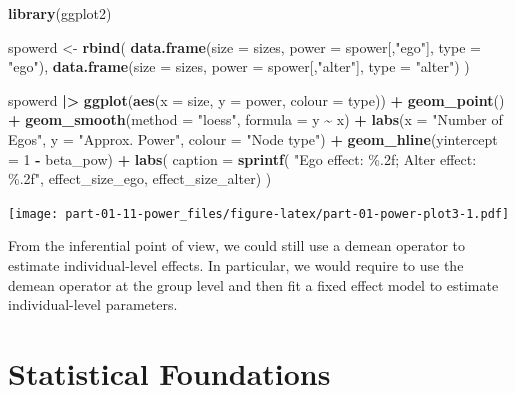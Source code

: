 \documentclass[
]{book}
\newenvironment{Shaded}{\begin{snugshade}}{\end{snugshade}}
\newcommand{\AttributeTok}[1]{\textcolor[rgb]{0.13,0.29,0.53}{#1}}
\newcommand{\DecValTok}[1]{\textcolor[rgb]{0.00,0.00,0.81}{#1}}
\newcommand{\FunctionTok}[1]{\textcolor[rgb]{0.13,0.29,0.53}{\textbf{#1}}}
\newcommand{\NormalTok}[1]{#1}
\newcommand{\OtherTok}[1]{\textcolor[rgb]{0.56,0.35,0.01}{#1}}
\newcommand{\SpecialCharTok}[1]{\textcolor[rgb]{0.81,0.36,0.00}{\textbf{#1}}}
\newcommand{\StringTok}[1]{\textcolor[rgb]{0.31,0.60,0.02}{#1}}
\begin{document}
\begin{Shaded}
\begin{Highlighting}[]
\FunctionTok{library}\NormalTok{(ggplot2)}

\NormalTok{spowerd }\OtherTok{\textless{}{-}} \FunctionTok{rbind}\NormalTok{(}
  \FunctionTok{data.frame}\NormalTok{(}\AttributeTok{size =}\NormalTok{ sizes, }\AttributeTok{power =}\NormalTok{ spower[,}\StringTok{"ego"}\NormalTok{], }\AttributeTok{type =}  \StringTok{"ego"}\NormalTok{),}
  \FunctionTok{data.frame}\NormalTok{(}\AttributeTok{size =}\NormalTok{ sizes, }\AttributeTok{power =}\NormalTok{ spower[,}\StringTok{"alter"}\NormalTok{], }\AttributeTok{type =}  \StringTok{"alter"}\NormalTok{)}
\NormalTok{)}

\NormalTok{spowerd }\SpecialCharTok{|\textgreater{}}
  \FunctionTok{ggplot}\NormalTok{(}\FunctionTok{aes}\NormalTok{(}\AttributeTok{x =}\NormalTok{ size, }\AttributeTok{y =}\NormalTok{ power, }\AttributeTok{colour =}\NormalTok{ type)) }\SpecialCharTok{+}
  \FunctionTok{geom\_point}\NormalTok{() }\SpecialCharTok{+}
  \FunctionTok{geom\_smooth}\NormalTok{(}\AttributeTok{method =} \StringTok{"loess"}\NormalTok{, }\AttributeTok{formula =}\NormalTok{ y }\SpecialCharTok{\textasciitilde{}}\NormalTok{ x) }\SpecialCharTok{+}
  \FunctionTok{labs}\NormalTok{(}\AttributeTok{x =} \StringTok{"Number of Egos"}\NormalTok{, }\AttributeTok{y =} \StringTok{"Approx. Power"}\NormalTok{, }\AttributeTok{colour =} \StringTok{"Node type"}\NormalTok{) }\SpecialCharTok{+}
  \FunctionTok{geom\_hline}\NormalTok{(}\AttributeTok{yintercept =} \DecValTok{1} \SpecialCharTok{{-}}\NormalTok{ beta\_pow) }\SpecialCharTok{+}
  \FunctionTok{labs}\NormalTok{(}
    \AttributeTok{caption =} \FunctionTok{sprintf}\NormalTok{(}
      \StringTok{"Ego effect: \%.2f; Alter effect: \%.2f"}\NormalTok{, effect\_size\_ego, effect\_size\_alter)}
\NormalTok{      )}
\end{Highlighting}
\end{Shaded}

\texttt{[image: part-01-11-power\_files/figure-latex/part-01-power-plot3-1.pdf]}

From the inferential point of view, we could still use a demean operator to estimate
individual-level effects. In particular, we would require to use the demean operator at the group level and then fit a fixed effect model to estimate individual-level parameters.

\hypertarget{part-statistical-foundations}{%
\part{Statistical Foundations}\label{part-statistical-foundations}}
\end{document}
